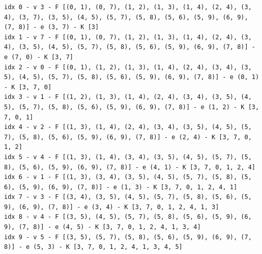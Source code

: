 \documentclass[a4paper,11pt]{report}
\begin{document}
\begin{verbatim}
idx 0 - v 3 - F [(0, 1), (0, 7), (1, 2), (1, 3), (1, 4), (2, 4), (3, 4), (3, 7), (3, 5), (4, 5), (5, 7), (5, 8), (5, 6), (5, 9), (6, 9), (7, 8)] - e (3, 7) - K [3]
idx 1 - v 7 - F [(0, 1), (0, 7), (1, 2), (1, 3), (1, 4), (2, 4), (3, 4), (3, 5), (4, 5), (5, 7), (5, 8), (5, 6), (5, 9), (6, 9), (7, 8)] - e (7, 0) - K [3, 7]
idx 2 - v 0 - F [(0, 1), (1, 2), (1, 3), (1, 4), (2, 4), (3, 4), (3, 5), (4, 5), (5, 7), (5, 8), (5, 6), (5, 9), (6, 9), (7, 8)] - e (0, 1) - K [3, 7, 0]
idx 3 - v 1 - F [(1, 2), (1, 3), (1, 4), (2, 4), (3, 4), (3, 5), (4, 5), (5, 7), (5, 8), (5, 6), (5, 9), (6, 9), (7, 8)] - e (1, 2) - K [3, 7, 0, 1]
idx 4 - v 2 - F [(1, 3), (1, 4), (2, 4), (3, 4), (3, 5), (4, 5), (5, 7), (5, 8), (5, 6), (5, 9), (6, 9), (7, 8)] - e (2, 4) - K [3, 7, 0, 1, 2]
idx 5 - v 4 - F [(1, 3), (1, 4), (3, 4), (3, 5), (4, 5), (5, 7), (5, 8), (5, 6), (5, 9), (6, 9), (7, 8)] - e (4, 1) - K [3, 7, 0, 1, 2, 4]
idx 6 - v 1 - F [(1, 3), (3, 4), (3, 5), (4, 5), (5, 7), (5, 8), (5, 6), (5, 9), (6, 9), (7, 8)] - e (1, 3) - K [3, 7, 0, 1, 2, 4, 1]
idx 7 - v 3 - F [(3, 4), (3, 5), (4, 5), (5, 7), (5, 8), (5, 6), (5, 9), (6, 9), (7, 8)] - e (3, 4) - K [3, 7, 0, 1, 2, 4, 1, 3]
idx 8 - v 4 - F [(3, 5), (4, 5), (5, 7), (5, 8), (5, 6), (5, 9), (6, 9), (7, 8)] - e (4, 5) - K [3, 7, 0, 1, 2, 4, 1, 3, 4]
idx 9 - v 5 - F [(3, 5), (5, 7), (5, 8), (5, 6), (5, 9), (6, 9), (7, 8)] - e (5, 3) - K [3, 7, 0, 1, 2, 4, 1, 3, 4, 5]    
\end{verbatim}
\end{document}
